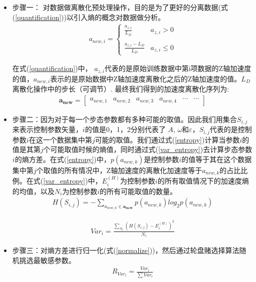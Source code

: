 \begin{itemize}
	\item 步骤一： 对数据做离散化预处理操作，目的是为了更好的分离数据(式(\ref{quantification}))以引入熵的概念对数据做分析。
	\begin{eqnarray}\label{quantification}
	a_{new,i}=\left\{
	\begin{array}{lr}
	\frac{a_{z,i}}{L_{D}} &a_{z,i}> 0\\
	\\
	\frac{a_{z,i}-L_{D}}{L_{D}} &a_{z,i}\leq 0
	\end{array}
	\right.
	\end{eqnarray}
	
	在式(\ref{quantification})中， $a_{z,i}$代表的是原始训练数据中第i项数据的Z轴加速度的值，$a_{new,i}$表示的是原始数据中Z轴加速度离散化之后的Z轴加速度的值。$L_{D}$离散化操作中的步长（可调节）. 最终我们得到的加速度离散化序列为:
	\begin{eqnarray}\label{newMember}
	\bm{a_{new}}=\begin{bmatrix}
	a_{new,1} & a_{new,2} & a_{new,3} & a_{new,4} & \cdots & \cdots
	\end{bmatrix}
	\end{eqnarray}
	
	\item 步骤二：因为对于每一个步态参数都有多种可能的取值。因此我们用集合$S_{i,j}$来表示控制参数矢量，$i$的值是0，1，2分别代表了 $A$, $\omega$和$\varepsilon$，$S_{i,j}$代表的是控制参数$i$在这一个数据集中第$j$可能的取值。我们通过式(\ref{entropy})计算当参数$i$的值是其第$j$个可能取值时候的熵值，同时通过式(\ref{var_entropy})去计算步态参数$i$的熵方差。在式(\ref{entropy})中，$p(a_{new,k})$是控制参数$i$的值等于其在这个数据集中第$j$个取值的所有情况中，Z轴加速度的离散化加速度等于$a_{new,k}$的占比比例。在式(\ref{var_entropy})中，$E^{(H)}_{i}$为控制参数$i$的所有取值情况下的加速度熵的均值，以及$N_{i}$为控制参数$i$的所有可能取值的数量。
	\begin{eqnarray}\label{entropy}
	H(S_{i,j})=-\sum _{a_{new,k}\in \bm{a_{new}}}p(a_{new,k})log_{2}p(a_{new,k})
	\end{eqnarray}
	
	\begin{eqnarray}\label{var_entropy}
	Var_{i}=\frac{\sum _{N_{i}}(H(S_{i,j})-E^{(H)}_{i})^{2}}{N_{i}}
	\end{eqnarray}
	
	\item 步骤三：对熵方差进行归一化(式(\ref{normalize}))，然后通过轮盘赌选择算法随机挑选最敏感参数。
	\begin{eqnarray}\label{normalize}
	R_{Var_{i}}=\frac{Var_{i}}{\sum Var_{i}}
	\end{eqnarray}
	
\end{itemize}

